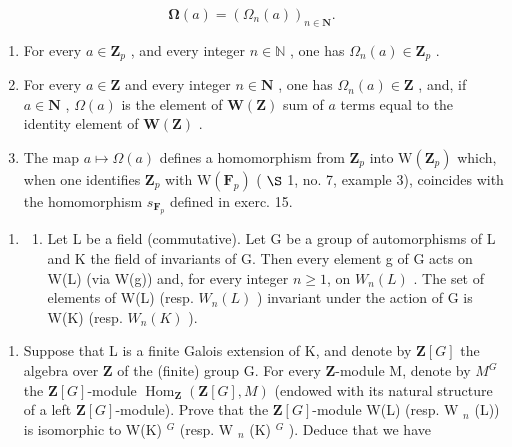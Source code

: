 \[
\boldsymbol {\Omega} (a) = \left(\Omega_ {n} (a)\right) _ {n \in \mathbf {N}}.
\]

\begin{enumerate}
\def\labelenumi{\alph{enumi})}
\item
  For every \(a \in \mathbf{Z}_p\) , and every integer \(n \in \mathbb{N}\) , one has \(\Omega_n(a) \in \mathbf{Z}_p\) .
\item
  For every \(a \in \mathbf{Z}\) and every integer \(n \in \mathbf{N}\) , one has \(\Omega_n(a) \in \mathbf{Z}\) , and, if \(a \in \mathbf{N}\) , \(\Omega(a)\) is the element of \(\mathbf{W}(\mathbf{Z})\) sum of \(a\) terms equal to the identity element of \(\mathbf{W}(\mathbf{Z})\) .
\item
  The map \(a \mapsto \Omega(a)\) defines a homomorphism from \(\mathbf{Z}_{p}\) into \(\mathrm{W}(\mathbf{Z}_{p})\) which, when one identifies \(\mathbf{Z}_{p}\) with \(\mathrm{W}(\mathbf{F}_{p})\) ( \(\S\) 1, no. 7, example 3), coincides with the homomorphism \(s_{\mathbf{F}_{p}}\) defined in exerc. 15.
\end{enumerate}

\begin{enumerate}
\def\labelenumi{\arabic{enumi})}
\setcounter{enumi}{17}
\tightlist
\item
  \begin{enumerate}
  \def\labelenumii{\alph{enumii})}
  \tightlist
  \item
    Let L be a field (commutative). Let G be a group of automorphisms of L and K the field of invariants of G. Then every element g of G acts on W(L) (via W(g)) and, for every integer \(n \geqslant 1\), on \(W_{n}(L)\) . The set of elements of W(L) (resp. \(W_{n}(L)\) ) invariant under the action of G is W(K) (resp. \(W_{n}(K)\) ).
  \end{enumerate}
\end{enumerate}

\begin{enumerate}
\def\labelenumi{\alph{enumi})}
\setcounter{enumi}{1}
\tightlist
\item
  Suppose that L is a finite Galois extension of K, and denote by \(\mathbf{Z}[G]\) the algebra over \(\mathbf{Z}\) of the (finite) group G. For every \(\mathbf{Z}\)-module M, denote by \(M^{G}\) the \(\mathbf{Z}[G]\)-module \(\operatorname{Hom}_{\mathbf{Z}}(\mathbf{Z}[G], M)\) (endowed with its natural structure of a left \(\mathbf{Z}[G]\)-module). Prove that the \(\mathbf{Z}[G]\)-module W(L) (resp. W \(_{n}\) (L)) is isomorphic to W(K) \(^{G}\) (resp. W \(_{n}\) (K) \(^{G}\) ). Deduce that we have
\end{enumerate}

